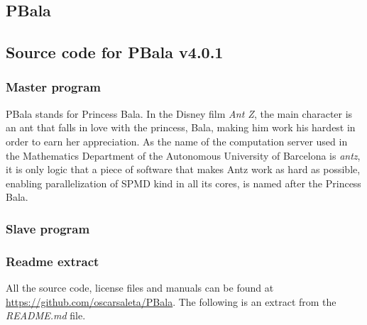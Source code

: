 
\begin{appendices}


\chapter{PBala}\label{apendix.pbala}

\section{Source code for PBala v4.0.1}

\subsection{Master program}


PBala stands for Princess Bala. In the Disney film \emph{Ant Z}, the main character is an ant that falls in love with the princess, Bala, making him work his hardest in order to earn her appreciation. As the name of the computation server used in the Mathematics Department of the Autonomous University of Barcelona is \emph{antz}, it is only logic that a piece of software that makes Antz work as hard as possible, enabling parallelization of SPMD kind in all its cores, is named after the Princess Bala.



\subsection{Slave program}






\subsection{Readme extract}

All the source code, license files and manuals can be found at \url{https://github.com/oscarsaleta/PBala}. The following is an extract from the \emph{README.md} file.



\end{appendices}
